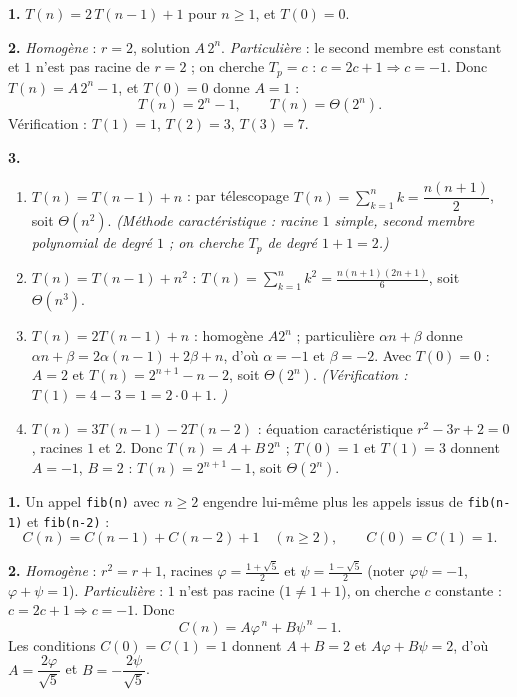 \documentclass[11pt,a4paper]{article}
\begin{document}

\reponse
\textbf{1.} $T(n) = 2\,T(n-1) + 1$ pour $n\ge1$, et $T(0)=0$.

\textbf{2.} \emph{Homogène} : $r = 2$, solution $A\,2^{n}$.
\emph{Particulière} : le second membre est constant et $1$ n'est pas racine de
$r=2$ ; on cherche $T_p = c$ : $c = 2c+1 \Rightarrow c=-1$.
Donc $T(n)=A\,2^{n}-1$, et $T(0)=0$ donne $A=1$ :
\[
  \boxed{T(n) = 2^{n}-1},\qquad T(n)=\Theta(2^{n}).
\]
Vérification : $T(1)=1$, $T(2)=3$, $T(3)=7$. \checkmark

\textbf{3.}
\begin{enumerate}[label=(\alph*),leftmargin=*,itemsep=3pt]
  \item $T(n)=T(n-1)+n$ : par télescopage $T(n)=\sum_{k=1}^{n}k=\dfrac{n(n+1)}{2}$,
        soit $\Theta(n^2)$.
        \emph{(Méthode caractéristique : racine $1$ simple, second membre polynomial de
        degré $1$ ; on cherche $T_p$ de degré $1+1=2$.)}
  \item $T(n)=T(n-1)+n^2$ : $T(n)=\displaystyle\sum_{k=1}^{n}k^2=\frac{n(n+1)(2n+1)}{6}$,
        soit $\Theta(n^3)$.
  \item $T(n)=2T(n-1)+n$ : homogène $A2^{n}$ ; particulière $\alpha n+\beta$ donne
        $\alpha n + \beta = 2\alpha(n-1)+2\beta+n$, d'où $\alpha=-1$ et $\beta=-2$.
        Avec $T(0)=0$ : $A=2$ et
        $\boxed{T(n)=2^{n+1}-n-2}$, soit $\Theta(2^{n})$.
        \emph{(Vérification : $T(1)=4-3=1=2\cdot0+1$. \checkmark)}
  \item $T(n)=3T(n-1)-2T(n-2)$ : équation caractéristique $r^2-3r+2=0$, racines
        $1$ et $2$. Donc $T(n)=A+B\,2^{n}$ ; $T(0)=1$ et $T(1)=3$ donnent $A=-1$, $B=2$ :
        $\boxed{T(n)=2^{n+1}-1}$, soit $\Theta(2^{n})$.
\end{enumerate}

\reponse
\textbf{1.} Un appel \texttt{fib(n)} avec $n\ge2$ engendre lui-même plus les appels
issus de \texttt{fib(n-1)} et \texttt{fib(n-2)} :
\[
  C(n) = C(n-1)+C(n-2)+1\quad (n\ge2),\qquad C(0)=C(1)=1.
\]

\textbf{2.} \emph{Homogène} : $r^2 = r+1$, racines $\varphi=\frac{1+\sqrt5}{2}$ et
$\psi=\frac{1-\sqrt5}{2}$ (noter $\varphi\psi=-1$, $\varphi+\psi=1$).
\emph{Particulière} : $1$ n'est pas racine ($1\ne 1+1$), on cherche $c$ constante :
$c=2c+1 \Rightarrow c=-1$. Donc
\[
  C(n) = A\varphi^{\,n}+B\psi^{\,n}-1 .
\]
Les conditions $C(0)=C(1)=1$ donnent $A+B=2$ et $A\varphi+B\psi=2$, d'où
$A = \dfrac{2\varphi}{\sqrt5}$ et $B = -\dfrac{2\psi}{\sqrt5}$.
\end{document}
